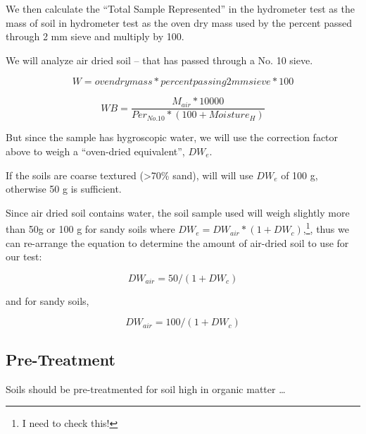 \documentclass[12pt]{../SOP3_alpha}
\begin{document}
\NP We then calculate the ``Total Sample Represented'' in the hydrometer test as the mass of soil in hydrometer test as the oven dry mass used by the percent passed through 2 mm sieve and multiply by 100.

\NP We will analyze air dried soil -- that has passed through a No. 10 sieve. 

\begin{equation}
W = oven dry mass * percent passing 2mm sieve * 100
\end{equation}

\begin{equation}
WB = \frac{M_{air}*10000}{Per_{No.10} * (100 + Moisture_H)}
\end{equation}

\NP But since the sample has hygroscopic water, we will use the correction factor above to weigh a ``oven-dried equivalent'', $DW_e$. 

\NP If the soils are coarse textured (>70\% sand), will will use $DW_e$ of 100 g, otherwise 50 g is sufficient.

\NP Since air dried soil contains water, the soil sample used will weigh slightly more than 50g or 100 g for sandy soils where $DW_e = DW_{air} * (1 + DW_c)$,\footnote{I need to check this!}, thus we can re-arrange the equation to determine the amount of air-dried soil to use for our test:

\begin{equation}
DW_{air} = 50/(1+DW_c)
\end{equation}

\noindent and for sandy soils,

\begin{equation}
DW_{air} = 100/(1+DW_c)
\end{equation}

\subsection*{Pre-Treatment}

\NP Soils should be pre-treatmented for soil high in organic matter \ldots
\end{document}
